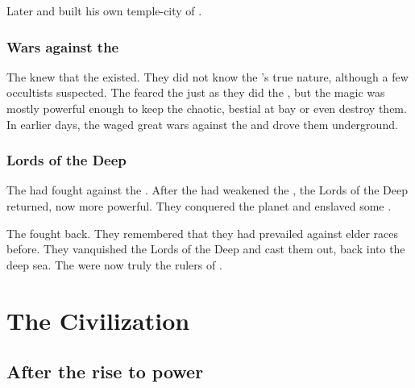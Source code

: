 Later  and built his own temple-city of \Baltherium.





\subsubsection{Wars against the \noggyaleth}
The \ophidians knew that the \noggyaleth existed. 
They did not know the \noggyaleth's true nature, although a few occultists suspected.
The \ophidians feared the \noggyaleth just as they did the \xss, but the \ophidian magic was mostly powerful enough to keep the chaotic, bestial \noggyaleth at bay or even destroy them.
In earlier days, the \ophidians waged great wars against the \noggyaleth and drove them underground.





\subsubsection{Lords of the Deep}
The  had fought against the \moonthings. 
After the \ophidians had weakened the \moonthings, the Lords of the Deep returned, now more powerful. 
They conquered the planet and enslaved some \ophidians. 

The \ophidians fought back. 
They remembered that they had prevailed against elder races before. 
They vanquished the Lords of the Deep and cast them out, back into the deep sea. 
The \ophidians were now truly the rulers of \Miith. 















\section{The \Ophidian{} Civilization}







\subsection{After the \ophidian rise to power}





